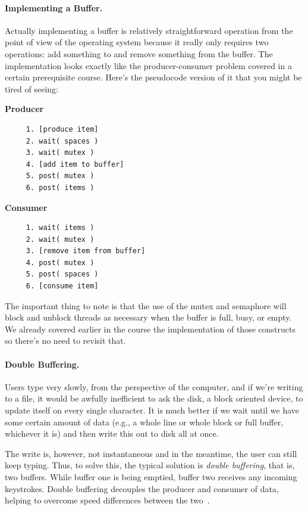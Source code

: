 \paragraph{Implementing a Buffer.}
Actually implementing a buffer is relatively straightforward operation from the point of view of the operating system because it really only requires two operations: add something to and remove something from the buffer. The implementation looks exactly like the producer-consumer problem covered in a certain prerequisite course. Here's the pseudocode version of it that you might be tired of seeing:


\begin{multicols}{2}
	\textbf{Producer}\vspace{-2em}
	\begin{verbatim}
	 1. [produce item]
	 2. wait( spaces )
	 3. wait( mutex )
	 4. [add item to buffer]
	 5. post( mutex )
	 6. post( items )
  \end{verbatim}
	\columnbreak
	\textbf{Consumer}\vspace{-2em}
	\begin{verbatim}
	 1. wait( items )
	 2. wait( mutex )
	 3. [remove item from buffer]
	 4. post( mutex )
	 5. post( spaces )
	 6. [consume item]
  \end{verbatim}
\end{multicols}
\vspace{-2em}

The important thing to note is that the use of the mutex and semaphore will block and unblock threads as necessary when the buffer is full, busy, or empty. We already covered earlier in the course the implementation of those constructs so there's no need to revisit that. 

\paragraph{Double Buffering.} Users type very slowly, from the perspective of the computer, and if we're writing to a file, it would be awfully inefficient to ask the disk, a block oriented device, to update itself on every single character. It is much better if we wait until we have some certain amount of data (e.g., a whole line or whole block or full buffer, whichever it is) and then write this out to disk all at once.

The write is, however, not instantaneous and in the meantime, the user can still keep typing. Thus, to solve this, the typical solution is \textit{double buffering}, that is, two buffers. While buffer one is being emptied, buffer two receives any incoming keystrokes. Double buffering decouples the producer and consumer of data, helping to overcome speed differences between the two~\cite{osc}.


